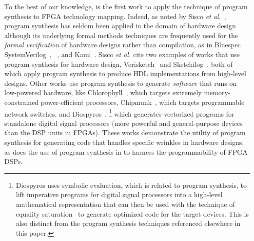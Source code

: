 \label{sec:background-and-related-work}

To the best of our knowledge,
  \lr is the first work
  to apply the technique of program synthesis
  to FPGA technology mapping.
Indeed, as noted by Sisco \textit{et al.}~\cite{sisco2022synthesis},
  program synthesis has seldom been applied
  in the domain of hardware design although
  its underlying formal methods techniques
  are frequently used for
  the \textit{formal verification}
  of hardware designs rather than compilation,
  as in Bluespec SystemVerilog~\cite{nikhil2004bluespec},
  \koika~\cite{bourgeat2020essence},
  and Kami~\cite{choi2017kami}.
Sisco \textit{et al.} cite two examples
  of works that use program synthesis for hardware design,
  Verisketch~\cite{ardeshiricham19verisketch} and Sketchilog~\cite{becker14sketchilog},
  both of which apply program synthesis to produce HDL implementations from high-level designs.
Other works use program synthesis
  to generate \textit{software}
  that runs on low-powered hardware,
  like Chlorophyll~\cite{phothilimthana2014chlorophyll},
  which targets extremely memory-constrained
  power-efficient processors,
  Chipmunk~\cite{gao2019chipmunk},
  which targets programmable network switches,
  and Diospyros~\cite{vanhattum2021vectorization},%
  \footnote{Diospyros uses symbolic evaluation, which is related to program synthesis, to lift imperative programs for digital signal processors into a high-level mathematical representation that can then be used with the technique of equality saturation~\cite{tate2011equality} to generate optimized code for the target devices. This is also distinct from the program synthesis techniques referenced elsewhere in this paper.}
  which generates vectorized programs for standalone digital signal processors (more powerful and general-purpose devices than the DSP units in FPGAs).
These works demonstrate the utility of program synthesis 
  for generating code that handles
  specific wrinkles in hardware designs,
  as does the use of program synthesis in \lr
  to harness the programmability of FPGA DSPs.

